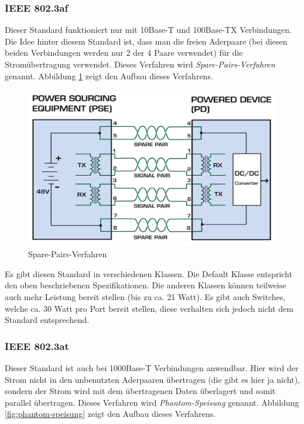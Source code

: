 \subsubsection{IEEE 802.3af}
Dieser Standard funktioniert nur mit 10Base-T und 100Base-TX Verbindungen. Die Idee hinter diesem Standard ist, dass man die freien Aderpaare (bei diesen beiden Verbindungen werden nur 2 der 4 Paare verwendet) für die Stromübertragung verwendet. Dieses Verfahren wird \emph{Spare-Pairs-Verfahren} genannt. Abbildung \ref{fig:spare-pairs} zeigt den Aufbau dieses Verfahrens.

\begin{figure}[h]
    \centering
    \leavevmode
    \includegraphics[width=1.0\linewidth]{figures/spare-pairs-verfahren}
    \caption{Spare-Pairs-Verfahren\cite{poe1}}
    \label{fig:spare-pairs}
\end{figure}

Es gibt diesen Standard in verschiedenen Klassen. Die Default Klasse entspricht den oben beschriebenen Spezifikationen. Die anderen Klassen können teilweise auch mehr Leistung bereit stellen (bis zu ca. 21 Watt). Es gibt auch Switches, welche ca. 30 Watt pro Port bereit stellen, diese verhalten sich jedoch nicht dem Standard entsprechend.

\subsubsection{IEEE 802.3at}
Dieser Standard ist auch bei 1000Base-T Verbindungen anwendbar. Hier wird der Strom nicht in den unbenutzten Aderpaaren übertragen (die gibt es hier ja nicht), sondern der Strom wird mit dem übertragenen Daten überlagert und somit parallel übertragen. Dieses Verfahren wird \emph{Phantom-Speisung} genannt. Abbildung \ref{fig:phantom-speisung} zeigt den Aufbau dieses Verfahrens.


